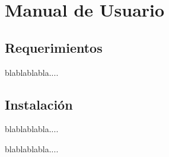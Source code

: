 
\chapter{Manual de Usuario}
\label{cap:manual}


\section{Requerimientos}

blablablabla....

\section{Instalaci\'on}

blablablabla....

blablablabla....
